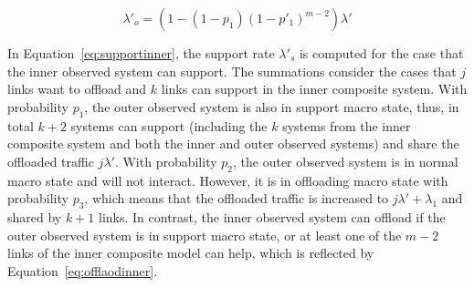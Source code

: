 \begin{equation}
\lambda'_{o} = (1-(1-p_1)(1-p'_1)^{m-2})\lambda'
\label{eq:offlaodinner}
\end{equation}

In Equation~\ref{eq:supportinner}, the support rate $\lambda'_s$ is computed for the case that the inner observed system can support. The summations consider the cases that $j$ links want to offload and $k$ links can support in the inner composite system. With probability $p_1$, the outer observed system is also in support macro state, thus, in total $k+2$ systems can support (including the $k$ systems from the inner composite system and both the inner and outer observed systems) and share the offloaded traffic $j\lambda'$. With probability $p_2$, the outer observed system is in normal macro state and will not interact. However, it is in offloading macro state with probability $p_3$, which means that the offloaded traffic is increased to $j\lambda'+\lambda_1$ and shared by $k+1$ links. In contrast, the inner observed system can offload if the outer observed system is in support macro state, or at least one of the $m-2$ links of the inner composite model can help, which is reflected by Equation~\ref{eq:offlaodinner}.

%
%
%

